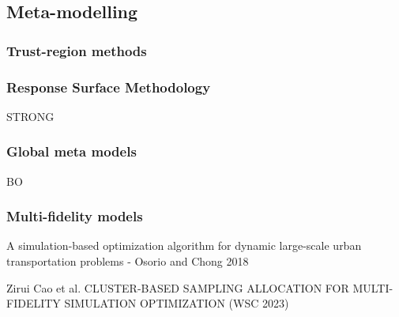 \message{ !name(SO-Methods.tex)}\documentclass{article}
\begin{document}
\subsection{Meta-modelling}

\subsubsection{Trust-region methods}

\subsubsection{Response Surface Methodology}

STRONG

\subsubsection{Global meta models}

BO

\subsubsection{Multi-fidelity models}

A simulation-based optimization algorithm for dynamic large-scale urban transportation problems - Osorio and Chong 2018 \newline

Zirui Cao et al. CLUSTER-BASED SAMPLING ALLOCATION FOR MULTI-FIDELITY SIMULATION OPTIMIZATION (WSC 2023)
\end{document}
